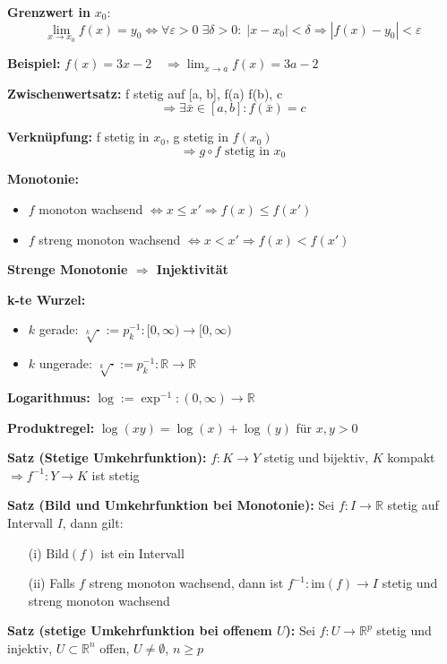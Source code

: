 \begin{itemize}
\textbf{Grenzwert in } $x_0$:  
\[
\lim_{x \to x_0} f(x) = y_0 \Leftrightarrow
\forall \varepsilon > 0\; \exists \delta > 0:\; |x - x_0| < \delta \Rightarrow |f(x) - y_0| < \varepsilon
\]

\textbf{Beispiel:}  
$f(x) = 3x - 2 \quad \Rightarrow \lim_{x \to a} f(x) = 3a - 2$

\textbf{Zwischenwertsatz:}  
f stetig auf [a, b],\; f(a) \leq f(b),\; c \in [f(a), f(b)]  
\[
\Rightarrow \exists \bar{x} \in [a, b]: f(\bar{x}) = c
\]

\textbf{Verknüpfung:}  
f stetig in \( x_0 \),\; g stetig in \( f(x_0) \)  
\[
\Rightarrow g \circ f \text{ stetig in } x_0
\]

\textbf{Monotonie:}
\begin{itemize}
  \item \(f\) monoton wachsend \(\Leftrightarrow x \le x' \Rightarrow f(x) \le f(x')\)
  \item \(f\) streng monoton wachsend \(\Leftrightarrow x < x' \Rightarrow f(x) < f(x')\)
\end{itemize}

\textbf{Strenge Monotonie $\Rightarrow$ Injektivität}

\textbf{k-te Wurzel:}
\begin{itemize}
  \item \(k\) gerade: \(\sqrt[k]{\cdot} := p_k^{-1}: [0, \infty) \to [0, \infty)\)
  \item \(k\) ungerade: \(\sqrt[k]{\cdot} := p_k^{-1}: \mathbb{R} \to \mathbb{R}\)
\end{itemize}

\textbf{Logarithmus:}  
\(\log := \exp^{-1} : (0,\infty) \to \mathbb{R}\)

\textbf{Produktregel:}  
\(\log(xy) = \log(x) + \log(y)\) für \(x, y > 0\)

\textbf{Satz (Stetige Umkehrfunktion):}  
\(f: K \to Y\) stetig und bijektiv,\; \(K\) kompakt  
\(\Rightarrow f^{-1}: Y \to K\) ist stetig

\textbf{Satz (Bild und Umkehrfunktion bei Monotonie):}  
Sei \(f: I \to \mathbb{R}\) stetig auf Intervall \(I\), dann gilt:
\begin{itemize}
  \item[(i)] \(\text{Bild}(f)\) ist ein Intervall
  \item[(ii)] Falls \(f\) streng monoton wachsend, dann ist \(f^{-1}: \text{im}(f) \to I\) stetig und streng monoton wachsend
\end{itemize}

\textbf{Satz (stetige Umkehrfunktion bei offenem \(U\)):}  
Sei \(f: U \to \mathbb{R}^p\) stetig und injektiv, \(U \subset \mathbb{R}^n\) offen, \(U \ne \emptyset\), \(n \ge p\)


\end{itemize}
